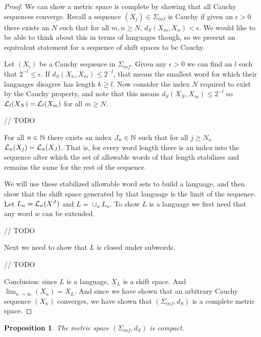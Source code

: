 \documentclass[11pt, reqno]{amsart}
\theoremstyle{plain}
\newtheorem{prop}[thm]{Proposition}
\theoremstyle{definition}
\begin{document}
\begin{proof}
    We can show a metric space is complete by showing that all Cauchy sequences converge. Recall a sequence $(X_j) \in \Sigma_{inf}$ is Cauchy if given an $\epsilon > 0$ there exists an $N$ such that for all $m, n \geq N$, $d_S(X_m, X_n) < \epsilon$. We would like to be able to think about this in terms of languages though, so we present an equivalent statement for a sequence of shift spaces to be Cauchy.
    
    Let $(X_i)$ be a Cauchy sequence in $\Sigma_{inf}$. Given any $\epsilon > 0$ we can find an $l$ such that $2^{-l} \leq \epsilon$. If $d_S(X_n, X_m) \leq 2^{-l}$, that means the smallest word for which their languages disagree has length $k \geq l$. Now consider the index $N$ required to exist by the Cauchy property, and note that this means $d_S(X_N, X_m) \leq 2^{-l}$ so $\mathcal{L}_l(X_N) = \mathcal{L}_l(X_m)$ for all $m \geq N$.  

    // TODO

    For all $n \in \mathbb{N}$ there exists an index $J_n \in \mathbb{N}$ such that for all $j \geq N_n$ $\mathcal{L}_n(X_j) = \mathcal{L}_n(X_J)$. That is, for every word length there is an index into the sequence after which the set of allowable words of that length stabilizes and remains the same for the rest of the sequence. 

    We will use these stabilized allowable word sets to build a language, and then show that the shift space generated by that language is the limit of the sequence. Let $L_n = \mathcal{L}_n(X^J)$ and $L = \cup_n L_n$. To show $L$ is a language we first need that any word $w$ can be extended.   

    // TODO 

    Next we need to show that $L$ is closed under subwords.   

    // TODO  

    Conclusion: since $L$ is a language, $X_L$ is a shift space. And $\lim_{n \rightarrow \infty} (X_n) = X_L$. And since we have shown that an arbitrary Cauchy sequence $(X_n)$ converges, we have shown that $(\Sigma_{inf}, d_S)$ is a complete metric space. 
\end{proof}

\begin{prop}
    The metric space $(\Sigma_{inf}, d_S)$ is compact.
\end{prop}
\end{document}
